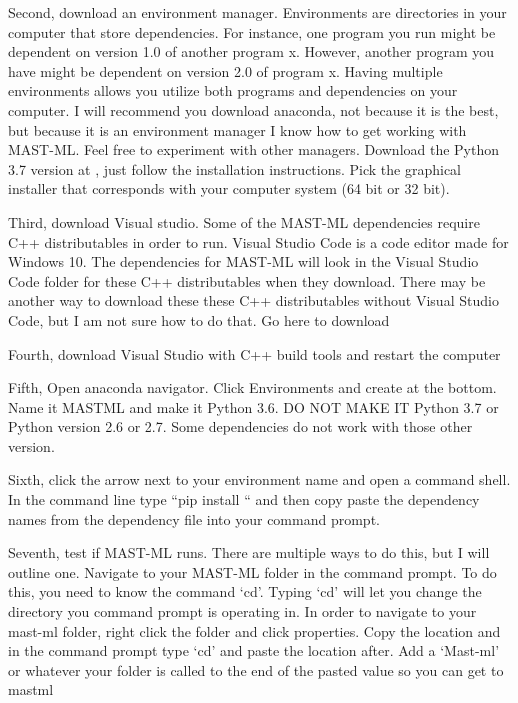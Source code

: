 \documentclass[letterpaper,10pt,english]{sphinxmanual}
\begin{document}
Second, download an environment manager. Environments are directories in your computer that store dependencies. For instance, one program you run might be dependent on version 1.0 of another program x. However, another program you have might be dependent on version 2.0 of program x. Having multiple environments allows you utilize both programs and dependencies on your computer. I will recommend you download anaconda, not because it is the best, but because it is an environment manager I know how to get working with MAST-ML. Feel free to experiment with other managers. Download the Python 3.7 version at , just follow the installation instructions. Pick the graphical installer that corresponds with your computer system (64 bit or 32 bit).

Third, download Visual studio. Some of the MAST-ML dependencies require C++ distributables in order to run. Visual Studio Code is a code editor made for Windows 10. The dependencies for MAST-ML will look in the Visual Studio Code folder for these C++ distributables when they download. There may be another way to download these these C++ distributables without Visual Studio Code, but I am not sure how to do that. Go here to download 

Fourth, download Visual Studio with C++ build tools and restart the computer

Fifth, Open anaconda navigator. Click Environments and create at the bottom. Name it MASTML and make it Python 3.6. DO NOT MAKE IT Python 3.7 or Python version 2.6 or 2.7. Some dependencies do not work with those other version.

Sixth, click the arrow next to your environment name and open a command shell. In the command line type “pip install “ and then copy paste the dependency names from the dependency file into your command prompt.

Seventh, test if MAST-ML runs. There are multiple ways to do this, but I will outline one. Navigate to your MAST-ML folder in the command prompt. To do this, you need to know the command ‘cd’. Typing ‘cd’ will let you change the directory you command prompt is operating in. In order to navigate to your mast-ml folder, right click the folder and click properties. Copy the location and in the command prompt type ‘cd’ and paste the location after. Add a ‘Mast-ml’ or whatever your folder is called to the end of the pasted value so you can get to mastml
\end{document}
